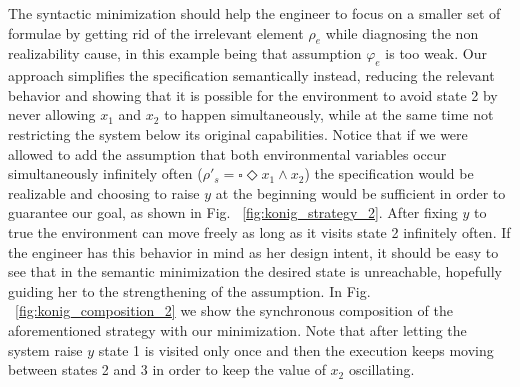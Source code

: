 The syntactic minimization should help the engineer to focus on a smaller set of formulae by getting rid of the irrelevant element $\rho_e$ while diagnosing the non realizability cause, in this example being that assumption $\varphi_e$ is too weak. Our approach simplifies the specification semantically instead, reducing the relevant behavior and showing that it is possible for the environment to avoid state 2 by never allowing $x_1$ and $x_2$ to happen simultaneously, while at the same time not restricting the system below its original capabilities. Notice that if we were allowed to add the assumption that both environmental variables occur simultaneously infinitely often ($\rho'_s = \square \Diamond x_1 \wedge x_2$) the specification would be realizable and choosing to raise $y$ at the beginning would be sufficient in order to guarantee our goal, as shown in Fig. ~\ref{fig:konig_strategy_2}. After fixing $y$ to true the environment can move freely as long as it visits state 2 infinitely often. If the engineer has this behavior in mind as her design intent, it should be easy to see that in the semantic minimization the desired state is unreachable, hopefully guiding her to the strengthening of the assumption.  In Fig. ~\ref{fig:konig_composition_2} we show the synchronous composition of the aforementioned strategy with our minimization. Note that after letting the system raise $y$ state 1 is visited only once and then the execution keeps moving between states 2 and 3 in order to keep the value of $x_2$ oscillating.


